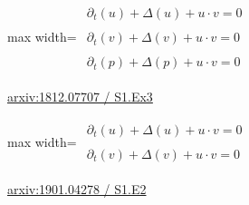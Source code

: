 \documentclass[UTF8,10pt,a4paper,fontset=mac]{ctexart}
\begin{document}
\begin{minipage}{\linewidth}\begin{center}\begin{adjustbox}{max width=\linewidth}$\displaystyle\begin{gathered}\begin{gathered}\partial_{t}(u)+\Delta(u)+u\cdot v=0\end{gathered}\\[5pt]\begin{gathered}\partial_{t}(v)+\Delta(v)+u\cdot v=0\end{gathered}\\[5pt]\begin{gathered}\partial_{t}(p)+\Delta(p)+u\cdot v=0\end{gathered}\end{gathered}$\end{adjustbox}\end{center}{\small\href{https://arxiv.org/html/1812.07707#S1.Ex3}{arxiv:1812.07707 / S1.Ex3}}\par\end{minipage}\par\vspace{6mm}

\begin{minipage}{\linewidth}\begin{center}\begin{adjustbox}{max width=\linewidth}$\displaystyle\begin{gathered}\begin{gathered}\partial_{t}(u)+\Delta(u)+u\cdot v=0\end{gathered}\\[5pt]\begin{gathered}\partial_{t}(v)+\Delta(v)+u\cdot v=0\end{gathered}\end{gathered}$\end{adjustbox}\end{center}{\small\href{https://arxiv.org/html/1901.04278#S1.E2}{arxiv:1901.04278 / S1.E2}}\par\end{minipage}\par\vspace{6mm}
\end{document}

